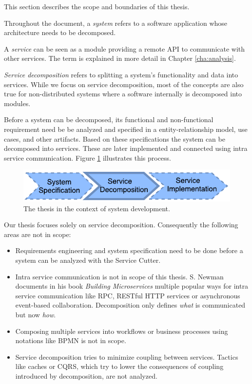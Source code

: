 This section describes the scope and boundaries of this thesis. 

Throughout the document, a \textit{system} refers to a software application whose architecture needs to be decomposed.

A \textit{service} can be seen as a module providing a remote \gls{API} to communicate with other services. The term is explained in more detail in Chapter \ref{cha:analysis}.

\textit{Service decomposition} refers to splitting a system's functionality and data into services. While we focus on service decomposition, most of the concepts are also true for non-distributed systems where a software internally is decomposed into modules. 

Before a system can be decomposed, its functional and non-functional requirement need be be analyzed and specified in a entity-relationship model, use cases, and other artifacts. Based on these specifications the system can be decomposed into services. These are later implemented and connected using intra service communication. Figure \ref{fig:context} illustrates this process.

\begin{figure}[H]
	\begin{center}
		\includegraphics[scale=1.4]{diagrams/context.pdf}
	\end{center}
	\caption{The thesis in the context of system development.}
	\label{fig:context}
\end{figure}

Our thesis focuses solely on service decomposition. Consequently the following areas are not in scope:

\begin{itemize}
	\item Requirements engineering and system specification need to be done before a system can be analyzed with the Service Cutter.
	\item Intra service communication is not in scope of this thesis. S. Newman documents in his book \textit{Building Microservices}\cite{newman2015building} multiple popular ways for intra service communication like \gls{RPC}, RESTful HTTP services or asynchronous event-based collaboration. Decomposition only defines \textit{what} is communicated but now \textit{how}. 
	\item Composing multiple services into workflows or business processes using notations like \gls{BPMN} is not in scope.
	\item Service decomposition tries to minimize coupling between services. Tactics like caches or \gls{CQRS}, which try to lower the consequences of coupling introduced by decomposition, are not analyzed. 
\end{itemize}


